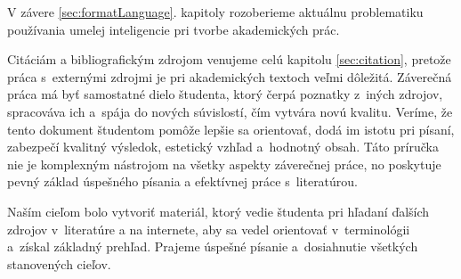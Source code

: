 V závere \ref{sec:formatLanguage}. kapitoly rozoberieme aktuálnu problematiku používania umelej inteligencie pri tvorbe akademických prác.

Citáciám a bibliografickým zdrojom venujeme celú kapitolu \ref{sec:citation},
pretože práca s~externými zdrojmi je pri akademických textoch veľmi dôležitá.
Záverečná práca má byť samostatné dielo študenta, 
ktorý čerpá poznatky z~iných zdrojov,
spracováva ich a~spája do nových súvislostí,
čím vytvára novú kvalitu.
Veríme, že tento dokument študentom pomôže lepšie sa orientovať,
dodá im istotu pri písaní,
zabezpečí kvalitný výsledok, estetický vzhľad
a~hodnotný obsah.
Táto príručka nie je komplexným nástrojom na všetky aspekty záverečnej práce,
no poskytuje pevný základ úspešného písania
a efektívnej práce s~literatúrou. 

Naším cieľom bolo vytvoriť materiál,
ktorý vedie študenta pri hľadaní ďalších zdrojov v~literatúre a na internete,
aby sa vedel orientovať v~terminológii a~získal základný prehľad.
Prajeme úspešné písanie a~dosiahnutie všetkých stanovených cieľov.